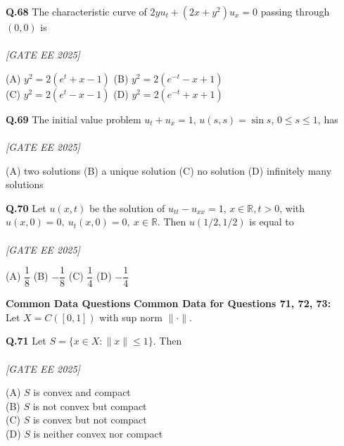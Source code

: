 \documentclass[11pt]{article}
\begin{document}
\begin{flushleft}
\textbf{Q.68} The characteristic curve of $2y u_t + (2x + y^2) u_x = 0$ passing through $(0, 0)$ is \\
\\[1ex] \textit{[GATE EE 2025]}

(A) $y^2 = 2(e^t + x - 1)$ \hspace{2em}
(B) $y^2 = 2(e^{-t} - x + 1)$ \\
(C) $y^2 = 2(e^t - x - 1)$ \hspace{2em}
(D) $y^2 = 2(e^{-t} + x + 1)$
\end{flushleft}

\begin{flushleft}
\textbf{Q.69} The initial value problem $u_t + u_x = 1$, $u(s,s) = \sin s$, $0 \leq s \leq 1$, has \\
\\[1ex] \textit{[GATE EE 2025]}


(A) two solutions \hspace{2em}
(B) a unique solution \hspace{2em}
(C) no solution \hspace{2em}
(D) infinitely many solutions
\end{flushleft}

\begin{flushleft}
\textbf{Q.70} Let $u(x,t)$ be the solution of $u_{tt} - u_{xx} = 1$, $x \in \mathbb{R}, t > 0$, with \\
$u(x,0) = 0, \ u_t(x,0) = 0, \ x \in \mathbb{R}$. Then $u(1/2, 1/2)$ is equal to \\
\\[1ex] \textit{[GATE EE 2025]}

(A) $\dfrac{1}{8}$ \hspace{2em} 
(B) $-\dfrac{1}{8}$ \hspace{2em} 
(C) $\dfrac{1}{4}$ \hspace{2em} 
(D) $-\dfrac{1}{4}$
\end{flushleft}

\begin{flushleft}
\textbf{Common Data Questions}
\newline
\textbf{Common Data for Questions 71, 72, 73:} \\
Let $X = C([0,1])$ with sup norm $\| \cdot \|$.
\end{flushleft}

\begin{flushleft}
\textbf{Q.71} Let $S = \{ x \in X : \|x\| \leq 1 \}$. Then \\
\\[1ex] \textit{[GATE EE 2025]}


(A) $S$ is convex and compact \\
(B) $S$ is not convex but compact \\
(C) $S$ is convex but not compact \\
(D) $S$ is neither convex nor compact
\end{flushleft}
\end{document}
